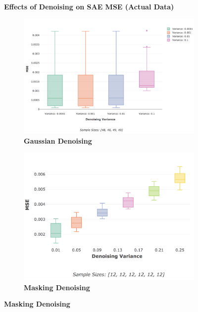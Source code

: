 \documentclass[a4paper,11pt,oneside]{article}
\theoremstyle{plain}
\theoremstyle{definition}
\begin{document}
\begin{figure}[H]
	\centering
	\textbf{Effects of Denoising on SAE MSE (Actual Data)}
	\begin{subfigure}{.5\textwidth}
		\centering 
		\includegraphics[scale=0.25]{images/results/network/denoising/actual_mse_gaussian.png}
		\caption{\textbf{Gaussian Denoising} 
			\newline }
		\label{figure-actual_mse_gaussian}
	\end{subfigure}%
	\begin{subfigure}{.5\textwidth}
		\centering 
		\includegraphics[scale=0.25]{images/results/network/denoising/actual_mse_masking.png}
		\caption{\textbf{Masking Denoising} 
			\newline }
		\label{figure-actual_mse_masking}
	\end{subfigure}

\end{figure}
\end{document}
